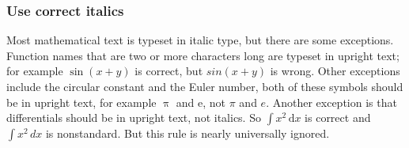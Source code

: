 \documentclass[12pt]{article}
\newcounter{ex}\setcounter{ex}{0}
\newcounter{se}\setcounter{se}{0}
\begin{document}
 \subsubsection{Use correct italics}
 
 Most mathematical text is typeset in italic type, but there are some exceptions. Function names that are two or more characters long are  typeset in upright text; for example \(\sin(x+y)\) is correct, but \(sin(x+y)\) is wrong.  Other
 exceptions include the circular constant and the Euler number, both  of these symbols should be in upright text, 
 for example \(\uppi\) and  \(\mathrm{e}\), not \(\pi\) and \(e\).  Another exception is  that differentials should be in 
 upright text, not italics.  So \(\int x^2 \, \mathrm{d} x\) is correct and \(\int x^2 \, d x\) is nonstandard. But this rule is nearly universally ignored.
\end{document}
